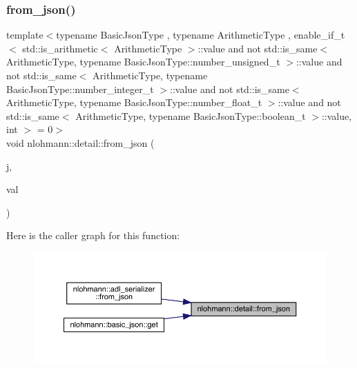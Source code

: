 \subsubsection{\texorpdfstring{from\_json()}{from\_json()}\hspace{0.1cm}{\footnotesize\ttfamily [11/11]}}
{\footnotesize\ttfamily template$<$typename Basic\+Json\+Type , typename Arithmetic\+Type , enable\+\_\+if\+\_\+t$<$ std\+::is\+\_\+arithmetic$<$ Arithmetic\+Type $>$\+::value and not std\+::is\+\_\+same$<$ Arithmetic\+Type, typename Basic\+Json\+Type\+::number\+\_\+unsigned\+\_\+t $>$\+::value and not std\+::is\+\_\+same$<$ Arithmetic\+Type, typename Basic\+Json\+Type\+::number\+\_\+integer\+\_\+t $>$\+::value and not std\+::is\+\_\+same$<$ Arithmetic\+Type, typename Basic\+Json\+Type\+::number\+\_\+float\+\_\+t $>$\+::value and not std\+::is\+\_\+same$<$ Arithmetic\+Type, typename Basic\+Json\+Type\+::boolean\+\_\+t $>$\+::value, int $>$  = 0$>$ \\
void nlohmann\+::detail\+::from\+\_\+json (\begin{DoxyParamCaption}\item[{const Basic\+Json\+Type \&}]{j,  }\item[{Arithmetic\+Type \&}]{val }\end{DoxyParamCaption})}

Here is the caller graph for this function\+:
\nopagebreak
\begin{figure}[H]
\begin{center}
\leavevmode
\includegraphics[width=350pt]{namespacenlohmann_1_1detail_a839b0ab50d2c9bce669068f56bc41202_icgraph}
\end{center}
\end{figure}
\mbox{\label{namespacenlohmann_1_1detail_ac53673a5ce29fb69b96d41dad33cb3b0}} 
